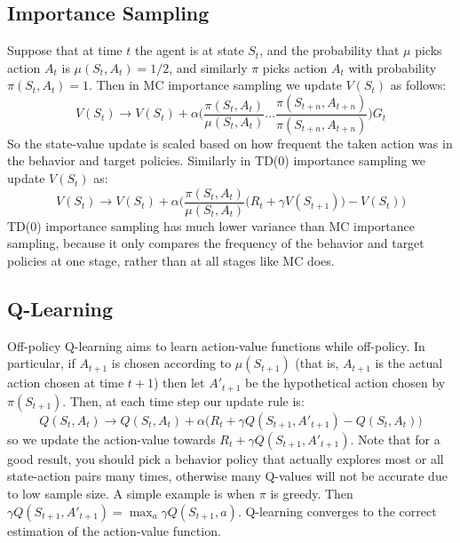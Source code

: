 \documentclass{article}
\begin{document}
\subsection{Importance Sampling}
Suppose that at time $t$ the agent is at state $S_t$, and the probability that $\mu$ picks action $A_t$ is $\mu(S_t, A_t) = 1/2$, and similarly $\pi$ picks action $A_t$ with probability $\pi(S_t, A_t) = 1$. Then in MC importance sampling we update $V(S_t)$ as follows:
\begin{equation}\label{eq:mc_importance_sampling}
V(S_t) \rightarrow V(S_t) + \alpha\bigg(\frac{\pi(S_t, A_t)}{\mu(S_t, A_t)}\ldots\frac{\pi(S_{t+n}, A_{t+n})}{\pi(S_{t+n}, A_{t+n})}\bigg)G_t
\end{equation}
So the state-value update is scaled based on how frequent the taken action was in the behavior and target policies. Similarly in TD(0) importance sampling we update $V(S_t)$ as:
\begin{equation}\label{eq:td0_importance_sampling}
V(S_t) \rightarrow V(S_t) + \alpha\bigg(\frac{\pi(S_t, A_t)}{\mu(S_t, A_t)} \big(R_t + \gamma V(S_{t+1})\big)- V(S_t)\bigg)
\end{equation}
TD(0) importance sampling has much lower variance than MC importance sampling, because it only compares the frequency of the behavior and target policies at one stage, rather than at all stages like MC does.

\subsection{Q-Learning}

Off-policy Q-learning aims to learn action-value functions while off-policy. In particular, if $A_{t+1}$ is chosen according to $\mu(S_{t+1})$ (that is, $A_{t+1}$ is the actual action chosen at time $t+1$) then let $A'_{t+1}$ be the hypothetical action chosen by $\pi(S_{t+1})$. Then, at each time step our update rule is:
\begin{equation}\label{eq:q_learning_update}
Q(S_t, A_t) \rightarrow Q(S_t, A_t) + \alpha\bigg(R_t + \gamma Q(S_{t+1}, A'_{t+1}) - Q(S_t, A_t)\bigg)
\end{equation}
so we update the action-value towards $R_t + \gamma Q(S_{t+1}, A'_{t+1})$. Note that for a good result, you should pick a behavior policy that actually explores most or all state-action pairs many times, otherwise many Q-values will not be accurate due to low sample size. A simple example is when $\pi$ is greedy. Then $\gamma Q(S_{t+1}, A'_{t+1}) = \max_{a} \gamma Q(S_{t+1}, a)$. Q-learning converges to the correct estimation of the action-value function.
\end{document}
